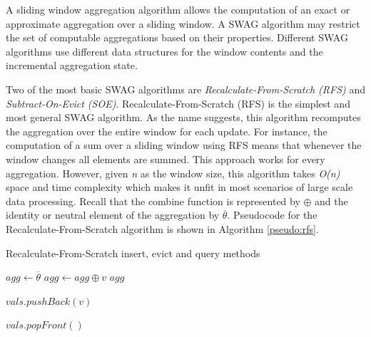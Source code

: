 A sliding window aggregation algorithm allows the computation of an exact or approximate aggregation over a sliding window. A SWAG algorithm may restrict the set of computable aggregations based on their properties. Different SWAG algorithms use different data structures for the window contents and the incremental aggregation state.

Two of the most basic SWAG algorithms are \textit{Recalculate-From-Scratch (RFS)} and \textit{Subtract-On-Evict (SOE)}. Recalculate-From-Scratch (RFS) is the simplest and most general SWAG algorithm. As the name suggests, this algorithm recomputes the aggregation over the entire window for each update. For instance, the computation of a sum over a sliding window using RFS means that whenever the window changes all elements are summed. This approach works for every aggregation. However, given \textit{n} as the window size, this algorithm takes \textit{O(n)} space and time complexity which makes it unfit in most scenarios of large scale data processing. Recall that the combine function is represented by $\oplus$ and the identity or neutral element of the aggregation by $\overline{\theta}$. Pseudocode for the Recalculate-From-Scratch algorithm is shown in Algorithm \ref{pseudo:rfs}.
  

\begin{algorithm}
    \caption{Recalculate-From-Scratch insert, evict and query methods}
    \label{pseudo:rfs}
    \begin{algorithmic}[1]
            \State $agg\gets\overline{\theta}$
                \State $agg \gets agg \oplus v$
            \EndFor
            \State \Return $agg$
        \EndFunction
        
        
        
            \State $vals.pushBack(v)$
        \EndFunction
        
        
        
            \State $vals.popFront()$
        \EndFunction
    \end{algorithmic}
\end{algorithm}

